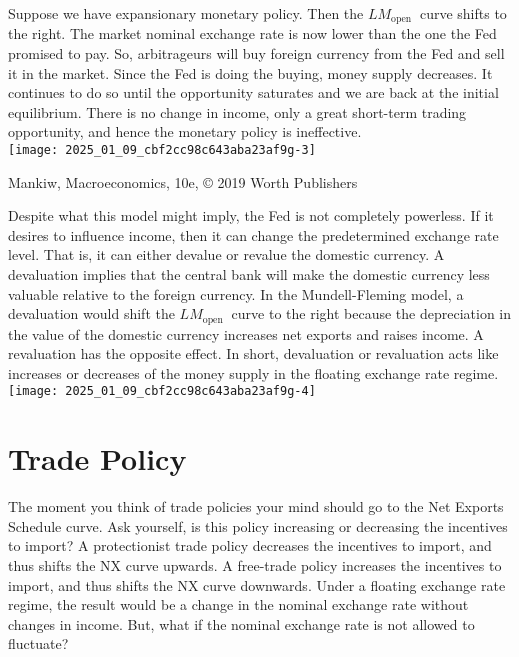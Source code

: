 \documentclass[10pt]{article}
\begin{document}
Suppose we have expansionary monetary policy. Then the $L M_{\text {open }}$ curve shifts to the right. The market nominal exchange rate is now lower than the one the Fed promised to pay. So, arbitrageurs will buy foreign currency from the Fed and sell it in the market. Since the Fed is doing the buying, money supply decreases. It continues to do so until the opportunity saturates and we are back at the initial equilibrium. There is no change in income, only a great short-term trading opportunity, and hence the monetary policy is ineffective.\\
\texttt{[image: 2025\_01\_09\_cbf2cc98c643aba23af9g-3]}

Mankiw, Macroeconomics, 10e, © 2019 Worth Publishers

Despite what this model might imply, the Fed is not completely powerless. If it desires to influence income, then it can change the predetermined exchange rate level. That is, it can either devalue or revalue the domestic currency. A devaluation implies that the central bank will make the domestic currency less valuable relative to the foreign currency. In the Mundell-Fleming model, a devaluation would shift the $L M_{\text {open }}$ curve to the right because the depreciation in the value of the domestic currency increases net exports and raises income. A revaluation has the opposite effect. In short, devaluation or revaluation acts like increases or decreases of the money supply in the floating exchange rate regime.\\
\texttt{[image: 2025\_01\_09\_cbf2cc98c643aba23af9g-4]}

\section*{Trade Policy}
The moment you think of trade policies your mind should go to the Net Exports Schedule curve. Ask yourself, is this policy increasing or decreasing the incentives to import? A protectionist trade policy decreases the incentives to import, and thus shifts the NX curve upwards. A free-trade policy increases the incentives to import, and thus shifts the NX curve downwards. Under a floating exchange rate regime, the result would be a change in the nominal exchange rate without changes in income. But, what if the nominal exchange rate is not allowed to fluctuate?
\end{document}
